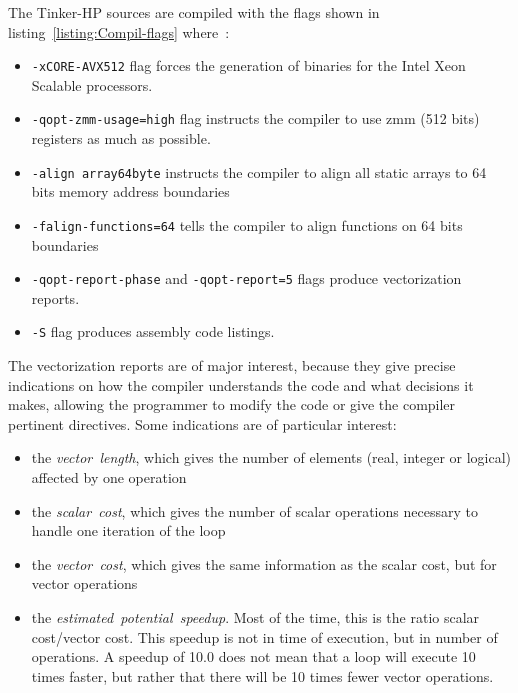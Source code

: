 \documentclass[9pt,comparison]{livecoms}
\newcommand{\lv}{\Large\verb}
\begin{document}
The Tinker-HP sources are compiled with the flags shown in listing~\ref{listing:Compil-flags} where~:
\begin{itemize}
    \item {\color{codepurple}\lv|-xCORE-AVX512|} flag forces the generation of binaries for the Intel Xeon Scalable processors.
    \item {\color{codepurple}\lv|-qopt-zmm-usage=high|} flag instructs the compiler to use {\color{red}zmm} (512 bits) registers as much as possible.
    \item {\color{codepurple}\lv|-align array64byte|} instructs the compiler to align all static arrays to 64 bits memory address boundaries
    \item {\color{codepurple}\lv|-falign-functions=64|} tells the compiler to align functions on 64 bits boundaries
    \item {\color{codepurple}\lv|-qopt-report-phase|} and {\color{codepurple}\lv|-qopt-report=5|} flags produce vectorization reports.
    \item {\color{codepurple}\lv|-S|} flag produces assembly code listings.
\end{itemize}


The vectorization reports are of major interest, because they give precise indications on how the compiler understands the code and what decisions it makes, allowing the programmer to modify the code or give the compiler pertinent directives. Some indications are of particular interest:

\begin{itemize}
    \item the \mbox{\em vector length}, which gives the number of elements (real, integer or logical) affected by one operation
    \item the \mbox{\em scalar cost}, which gives the number of scalar operations necessary to handle one iteration of the loop
    \item the \mbox{\em vector cost}, which gives the same information as the scalar cost, but for vector operations
    \item the \mbox{\em estimated potential speedup}. Most of the time, this is the ratio scalar cost/vector cost. This speedup is not in time of execution, but in number of operations. A speedup of 10.0 does not mean that a loop will execute 10 times faster, but rather that there will be 10 times fewer vector operations.
    \end{itemize}
 
\end{document}
